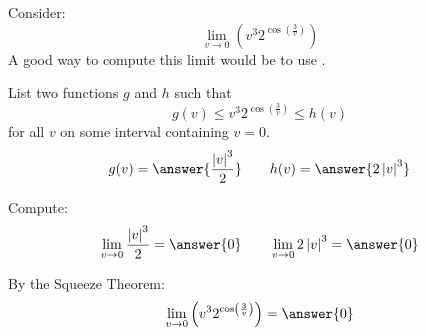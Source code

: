 \documentclass{ximera}
\author{Bart Snapp}
\begin{document}
\begin{exercise}


Consider:
\[
\lim_{v\to 0} \left(v^3 2^{\cos \left(\frac{3}{v}\right)}\right)
\]
A good way to compute this limit would be to use .
\begin{exercise}
List two functions $g$ and $h$ such that
\[
g(v)\le v^3 2^{\cos \left(\frac{3}{v}\right)} \le h(v)
\]
for all $v$ on some interval containing $v=0$.
\[
g(v)=\answer{\frac{\left| v\right| ^3}{2}}\qquad h(v) =\answer{2 \left| v\right| ^3}
\]
\begin{exercise}
Compute:
\[
\lim_{v \to 0}\frac{\left| v\right| ^3}{2} = \answer{0}\qquad \lim_{v\to 0}2 \left| v\right| ^3 = \answer{0}
\]
\begin{exercise}
By the Squeeze Theorem:
\[
\lim_{v\to 0} \left(v^3 2^{\cos \left(\frac{3}{v}\right)}\right) = \answer{0}
\]
\end{exercise}
\end{exercise}
\end{exercise}
\end{exercise}
\end{document}
